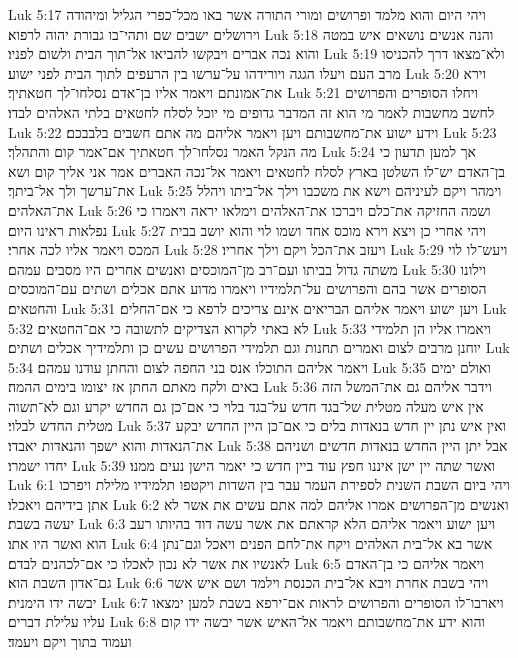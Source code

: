 Luk 5:17  ויהי היום והוא מלמד ופרושים ומורי התורה אשר באו מכל־כפרי הגליל ומיהודה וירושלים ישבים שם ותהי־בו גבורת יהוה לרפוא׃
Luk 5:18  והנה אנשים נושאים איש במטה והוא נכה אברים ויבקשו להביאו אל־תוך הבית ולשום לפניו׃
Luk 5:19  ולא־מצאו דרך להכניסו מרב העם ויעלו הגגה ויורידהו על־ערשו בין הרעפים לתוך הבית לפני ישוע׃
Luk 5:20  וירא את־אמונתם ויאמר אליו בן־אדם נסלחו־לך חטאתיך׃
Luk 5:21  ויחלו הסופרים והפרושים לחשב מחשבות לאמר מי הוא זה המדבר גדופים מי יוכל לסלח לחטאים בלתי האלהים לבדו׃
Luk 5:22  וידע ישוע את־מחשבותם ויען ויאמר אליהם מה אתם חשבים בלבבכם׃
Luk 5:23  מה הנקל האמר נסלחו־לך חטאתיך אם־אמר קום והתהלך׃
Luk 5:24  אך למען תדעון כי בן־האדם יש־לו השלטן בארץ לסלח לחטאים ויאמר אל־נכה האברים אמר אני אליך קום ושא את־ערשך ולך אל־ביתך׃
Luk 5:25  וימהר ויקם לעיניהם וישא את משכבו וילך אל־ביתו ויהלל את־האלהים׃
Luk 5:26  ושמה החזיקה את־כלם ויברכו את־האלהים וימלאו יראה ויאמרו כי נפלאות ראינו היום׃
Luk 5:27  ויהי אחרי כן ויצא וירא מוכס אחד ושמו לוי והוא יושב בבית המכס ויאמר אליו לכה אחרי׃
Luk 5:28  ויעזב את־הכל ויקם וילך אחריו׃
Luk 5:29  ויעש־לו לוי משתה גדול בביתו ועם־רב מן־המוכסים ואנשים אחרים היו מסבים עמהם׃
Luk 5:30  וילונו הסופרים אשר בהם והפרושים על־תלמידיו ויאמרו מדוע אתם אכלים ושתים עם־המוכסים והחטאים׃
Luk 5:31  ויען ישוע ויאמר אליהם הבריאים אינם צריכים לרפא כי אם־החלים׃
Luk 5:32  לא באתי לקרוא הצדיקים לתשובה כי אם־החטאים׃
Luk 5:33  ויאמרו אליו הן תלמידי יוחנן מרבים לצום ואמרים תחנות וגם תלמידי הפרושים עשים כן ותלמידיך אכלים ושתים׃
Luk 5:34  ויאמר אליהם התוכלו אנס בני החפה לצום והחתן עודנו עמהם׃
Luk 5:35  ואולם ימים באים ולקח מאתם החתן אז יצומו בימים ההמה׃
Luk 5:36  וידבר אליהם גם את־המשל הזה אין איש מעלה מטלית של־בגד חדש על־בגד בלוי כי אם־כן גם החדש יקרע וגם לא־תשוה מטלית החדש לבלוי׃
Luk 5:37  ואין איש נתן יין חדש בנאדות בלים כי אם־כן היין החדש יבקע את־הנאדות והוא ישפך והנאדות יאבדו׃
Luk 5:38  אבל יתן היין החדש בנאדות חדשים ושניהם יחדו ישמרו׃
Luk 5:39  ואשר שתה יין ישן איננו חפץ עוד ביין חדש כי יאמר הישן נעים ממנו׃
Luk 6:1  ויהי ביום השבת השנית לספירת העמר עבר בין השדות ויקטפו תלמידיו מלילת ויפרכו אתן בידיהם ויאכלו׃
Luk 6:2  ואנשים מן־הפרושים אמרו אליהם למה אתם עשים את אשר לא יעשה בשבת׃
Luk 6:3  ויען ישוע ויאמר אליהם הלא קראתם את אשר עשה דוד בהיותו רעב הוא ואשר היו אתו׃
Luk 6:4  אשר בא אל־בית האלהים ויקח את־לחם הפנים ויאכל וגם־נתן לאנשיו את אשר לא נכון לאכלו כי אם־לכהנים לבדם׃
Luk 6:5  ויאמר אליהם כי בן־האדם גם־אדון השבת הוא׃
Luk 6:6  ויהי בשבת אחרת ויבא אל־בית הכנסת וילמד ושם איש אשר יבשה ידו הימנית׃
Luk 6:7  ויארבו־לו הסופרים והפרושים לראות אם־ירפא בשבת למען ימצאו עליו עלילת דברים׃
Luk 6:8  והוא ידע את־מחשבותם ויאמר אל־האיש אשר יבשה ידו קום ועמוד בתוך ויקם ויעמד׃
